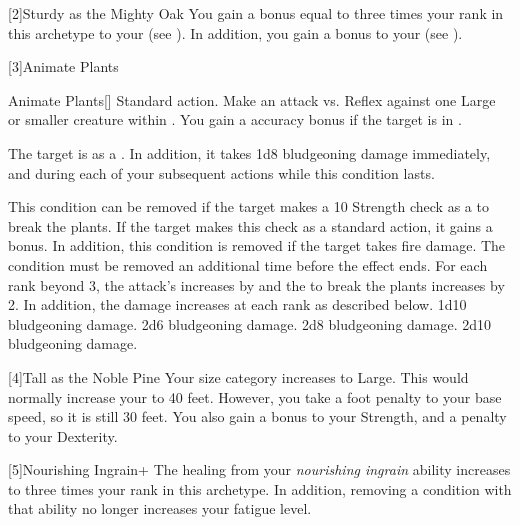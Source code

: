         [2]{Sturdy as the Mighty Oak} You gain a bonus equal to three times your rank in this archetype to your  (see ).
        In addition, you gain a  bonus to your  (see ).

        [3]{Animate Plants}
        \begin{activeability}{Animate Plants}[]
            \abilityusagetime Standard action.
            \rankline
            Make an attack vs. Reflex against one Large or smaller  creature within \medrange.
            You gain a  accuracy bonus if the target is in .

            \hit The target is \slowed as a .
            In addition, it takes 1d8 bludgeoning damage immediately, and during each of your subsequent actions while this condition lasts.

            This condition can be removed if the target makes a  10 Strength check as a  to break the plants.
            If the target makes this check as a standard action, it gains a  bonus.
            In addition, this condition is removed if the target takes fire damage.
            \crit The condition must be removed an additional time before the effect ends.
            \rankline
            For each rank beyond 3, the attack's  increases by  and the  to break the plants increases by 2.
            In addition, the damage increases at each rank as described below.
             1d10 bludgeoning damage.
             2d6 bludgeoning damage.
             2d8 bludgeoning damage.
             2d10 bludgeoning damage.
        \end{activeability}

        [4]{Tall as the Noble Pine} Your size category increases to Large.
        This would normally increase your  to 40 feet.
        However, you take a  foot penalty to your base speed, so it is still 30 feet.
        You also gain a  bonus to your Strength, and a  penalty to your Dexterity.

        [5]{Nourishing Ingrain+} The healing from your \textit{nourishing ingrain} ability increases to three times your rank in this archetype.
        In addition, removing a condition with that ability no longer increases your fatigue level.

